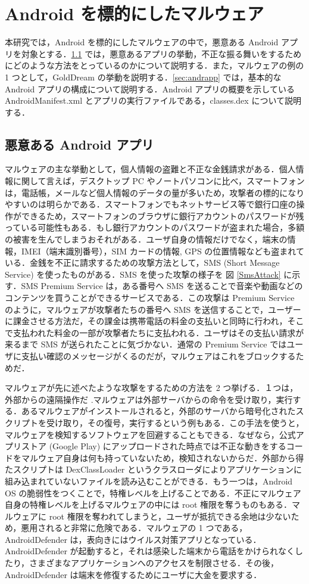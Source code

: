 \section{Android  を標的にしたマルウェア}
本研究では，Android を標的にしたマルウェアの中で，悪意ある Android アプリを対象とする．\ref{sec:malware} では，悪意あるアプリの挙動，不正な振る舞いをするためにどのような方法をとっているのかについて説明する．また，マルウェアの例の 1 つとして，GoldDream の挙動を説明する．\ref{sec:andrapp} では，基本的な Android アプリの構成について説明する．Android アプリの概要を示している AndroidManifest.xml とアプリの実行ファイルである，classes.dex について説明する．
\subsection{悪意ある Android  アプリ}
\label{sec:malware}
マルウェアの主な挙動として，個人情報の盗難と不正な金銭請求がある．個人情報に関して言えば，デスクトップ PC やノートパソコンに比べ，スマートフォンは，電話帳，メールなど個人情報のデータの量が多いため，攻撃者の標的になりやすいのは明らかである．スマートフォンでもネットサービス等で銀行口座の操作ができるため，スマートフォンのブラウザに銀行アカウントのパスワードが残っている可能性もある．もし銀行アカウントのパスワードが盗まれた場合，多額の被害を生んでしまうおそれがある．ユーザ自身の情報だけでなく，端末の情報，IMEI（端末識別番号），SIM カードの情報, GPS の位置情報なども盗まれている．金銭を不正に請求するための攻撃方法として，SMS (Short Message Service) を使ったものがある．SMS を使った攻撃の様子を 図 \ref{SmsAttack} に示す．SMS Premium Service は，ある番号へ SMS を送ることで音楽や動画などのコンテンツを買うことができるサービスである．この攻撃は Premium Service のように，マルウェアが攻撃者たちの番号へ SMS を送信することで，ユーザーに課金させる方法だ，その課金は携帯電話の料金の支払いと同時に行われ，そこで支払われた料金の一部が攻撃者たちに支払われる．ユーザはその支払い請求が来るまで SMS が送られたことに気づかない．通常の Premium Service ではユーザに支払い確認のメッセージがくるのだが，マルウェアはこれをブロックするためだ．

マルウェアが先に述べたような攻撃をするための方法を 2 つ挙げる．１つは，外部からの遠隔操作だ  \cite{remotectrl} .マルウェアは外部サーバからの命令を受け取り，実行する．あるマルウェアがインストールされると，外部のサーバから暗号化されたスクリプトを受け取り，その復号，実行するという例もある．この手法を使うと，マルウェアを検知するソフトウェアを回避することもできる．なぜなら，公式アプリストア (Google Play)  にアップロードされた時点では不正な動きをするコードをマルウェア自身は何も持っていないため，検知されないからだ．外部から得たスクリプトは DexClassLoader というクラスローダによりアプリケーションに組み込まれていないファイルを読み込むことができる．もう一つは，Android OS の脆弱性をつくことで，特権レベルを上げることである．不正にマルウェア自身の特権レベルを上げるマルウェアの中には root 権限を奪うものもある．マルウェアに root 権限を奪われてしまうと，ユーザが抵抗できる余地は少ないため，悪用されると非常に危険である．マルウェアの 1 つである，AndroidDefender \cite{sopho} は，表向きにはウイルス対策アプリとなっている．AndroidDefender が起動すると，それは感染した端末から電話をかけられなくしたり，さまざまなアプリケーションへのアクセスを制限させる．その後，AndroidDefender は端末を修復するためにユーザに大金を要求する．
 
